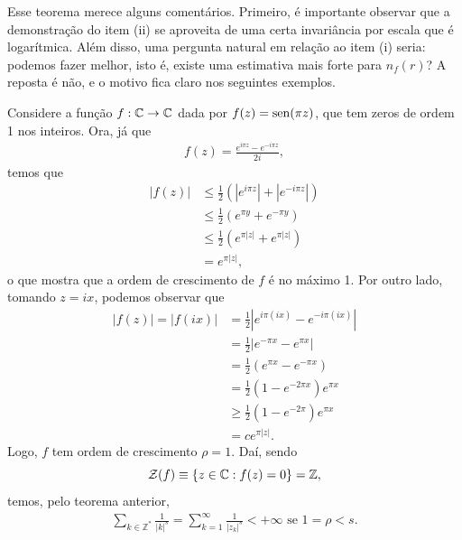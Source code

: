     Esse teorema merece alguns comentários. Primeiro, é importante observar que
    a demonstração do item (ii) se aproveita de uma certa invariância por escala
    que é logarítmica. Além disso, uma pergunta natural em relação ao item
    (i) seria: podemos fazer melhor, isto é, existe uma estimativa mais forte para
    $n_f(r)$? A reposta é não, e o motivo fica claro nos seguintes exemplos.
    \begin{exemplo}
        Considere a função $f:\mathbb{C}\to\mathbb{C}$ dada por $f(z) = \operatorname{sen}(\pi z)$, que tem
        zeros de ordem 1 nos inteiros. Ora, já que
        \begin{align*}
            f(z) = \frac{e^{i\pi z} - e^{-i\pi z}}{2i},
        \end{align*}
        temos que
        \begin{align*}
            |f(z)| &\leq \frac{1}{2}\left( |e^{i\pi z}| + |e^{-i\pi z}| \right) \\
                   &\leq \frac{1}{2}\left( e^{\pi y} + e^{-\pi y} \right) \\
                   &\leq \frac{1}{2}\left( e^{\pi |z|} + e^{\pi |z|} \right) \\
                   &= e^{\pi |z|},
        \end{align*}
        o que mostra que a ordem de crescimento de $f$ é no máximo 1. Por outro lado,
        tomando $z = ix$, podemos observar que
        \begin{align*}
            |f(z)|=|f(ix)|&=\frac{1}{2}\left| e^{i\pi (ix)} - e^{-i\pi (ix)} \right| \\
                          &= \frac{1}{2}\left| e^{-\pi x} - e^{\pi x} \right| \\
                          &= \frac{1}{2} \left( e^{\pi x} - e^{-\pi x} \right) \\
                          &= \frac{1}{2}\left( 1 - e^{-2\pi x} \right)e^{\pi x} \\
                          &\geq \frac{1}{2}\left( 1 - e^{-2\pi} \right)e^{\pi x} \\
                          &= ce^{\pi |z|}.
        \end{align*}
        Logo, $f$ tem ordem de crescimento $\rho = 1$. Daí, sendo
        \begin{equation*}
            \mathcal{Z}(f) \equiv \{ z\in\mathbb{C} : f(z) = 0 \} = \mathbb{Z},
        \end{equation*}
        temos, pelo teorema anterior,
        \begin{align*}
            \sum_{k\in\mathbb{Z}^*} \frac{1}{|k|^s} 
            = \sum_{k=1}^{\infty} \frac{1}{|z_k|^s} < +\infty \text{ se } 1 = \rho < s.
        \end{align*}
    \end{exemplo}
